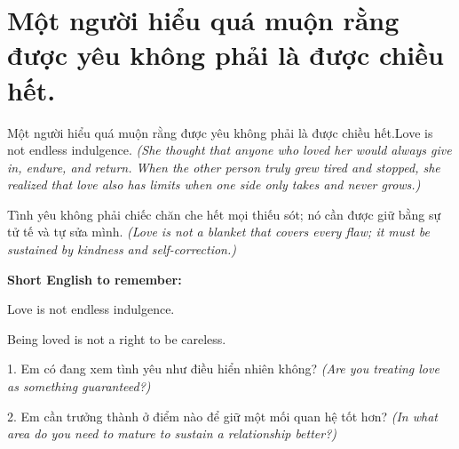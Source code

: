 \section{Một người hiểu quá muộn rằng được yêu không phải là được chiều hết.}
\begin{truyen}{Một người hiểu quá muộn rằng được yêu không phải là được chiều hết.}{Love is not endless indulgence.}
\textit{(She thought that anyone who loved her would always give in, endure, and return. When the other person truly grew tired and stopped, she realized that love also has limits when one side only takes and never grows.)}
\end{truyen}
\begin{baihoc}
Tình yêu không phải chiếc chăn che hết mọi thiếu sót; nó cần được giữ bằng sự tử tế và tự sửa mình.
\textit{(Love is not a blanket that covers every flaw; it must be sustained by kindness and self-correction.)}
\end{baihoc}
\begin{ghinhoanh}
\textbf{Short English to remember:}

Love is not endless indulgence.

Being loved is not a right to be careless.
\end{ghinhoanh}
\begin{tuhocnhanh}
1. Em có đang xem tình yêu như điều hiển nhiên không? \textit{(Are you treating love as something guaranteed?)}

2. Em cần trưởng thành ở điểm nào để giữ một mối quan hệ tốt hơn? \textit{(In what area do you need to mature to sustain a relationship better?)}
\end{tuhocnhanh}
\ngancach